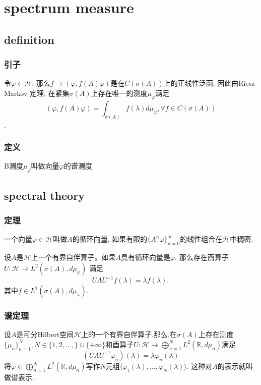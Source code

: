 \documentclass[compress,mathserif,red]{beamer}
\begin{document}
\section{spectrum measure}
\subsection{definition}
\begin{frame}
\frametitle{引子}
令$\varphi \in \mathcal{H}$. 那么$f\rightarrow(\varphi,f(A)
 \varphi)$是在$C(\sigma(A))$上的正线性泛函. 因此由Riesz-Markov
 定理, 在紧集$\sigma(A)$上存在唯一的测度$\mu_{\varphi}$满足
 $$(\varphi,f(A)
 \varphi)=\int_{\sigma(A)} f(\lambda)d\mu_{\varphi},\forall f\in C(\sigma(A))$$.

\end{frame}




\begin{frame}
\frametitle{定义}
\begin{definition}
B测度$\mu_{\varphi}$叫做向量$\varphi$的谱测度
\end{definition}

\end{frame}


\subsection{spectral theory}
\begin{frame}
\frametitle{定理}
\begin{definition}
一个向量$\varphi \in
\mathcal{H}$叫做$A$的循环向量, 如果有限的$\{A^n \varphi
\}_{n=0}^{\infty}$的线性组合在$\mathcal{H}$中稠密.
\end{definition}

\medskip
\begin{theorem}
设$A$是$\mathcal{H}$上一个有界自伴算子。如果$A$具有循环向量是$\varphi$.
那么存在酉算子$U: \mathcal{H} \rightarrow L^2(\sigma(A),d\mu_{\varphi})$
满足$$UAU^{-1}f(\lambda)=\lambda
f(\lambda),$$ 其中$f \in L^2(\sigma(A),d\mu_{\varphi})$.

\end{theorem}

\end{frame}

\begin{frame}
\frametitle{谱定理}
\begin{theorem}
设$A$是可分Hilbert空间$\mathcal{H}$上的一个有界自伴算子.那么,在$\sigma(A)$上存在测度$\{\mu_n\}_{n=1}^N,
 N\in
\{1,2,\ldots,\}\cup \{+\infty\}$和酉算子$U: \mathcal{H} \rightarrow
\bigoplus _{n=1}^N
L^2(\mathbb{R},d\mu_n)$满足$$(UAU^{-1}\varphi_n)(\lambda)=\lambda
\varphi_n(\lambda)$$将$\varphi \in\bigoplus _{n=1}^N
L^2(\mathbb{R},d\mu_n)$写作$N$元组$\langle
\varphi_1(\lambda),\ldots,\varphi_N(\lambda) \rangle$.
这种对$A$的表示就叫做谱表示.
\end{theorem}

\end{frame}
\end{document}
